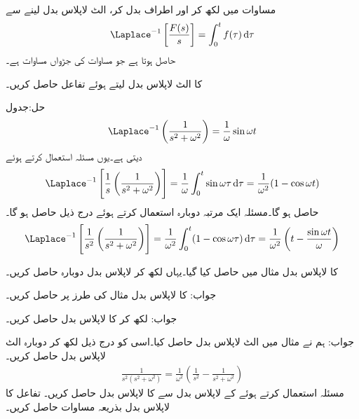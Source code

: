 مساوات  میں  لکھ کر اور اطراف بدل کر، الٹ لاپلاس بدل لینے سے
\begin{align}\label{مساوات_لاپلاس_تکمل_کا_بدل_جڑواں}
\Laplace^{-1}\left[\frac{F(s)}{s}\right]=\int_{0}^{t} f(\tau)\dif \tau
\end{align}
حاصل ہوتا ہے جو مساوات  کی جڑواں مساوات ہے۔

 کا الٹ لاپلاس بدل لیتے ہوئے تفاعل  حاصل کریں۔

حل:جدول  
\begin{align*}
\Laplace^{-1}\left(\frac{1}{s^2+\omega^2}\right)=\frac{1}{\omega}\sin \omega t
\end{align*}
دیتی ہے۔یوں مسئلہ  استعمال کرتے ہوئے
\begin{align*}
\Laplace^{-1}\left[\frac{1}{s}\left(\frac{1}{s^2+\omega^2}\right)\right]=\frac{1}{\omega} \int_{0}^{t}\sin \omega \tau \dif \tau=\frac{1}{\omega^2} (1-\cos \omega t)
\end{align*}
حاصل ہو گا۔مسئلہ  ایک مرتبہ دوبارہ استعمال کرتے ہوئے درج ذیل حاصل ہو گا۔
\begin{align*}
\Laplace^{-1}\left[\frac{1}{s^2} \left(\frac{1}{s^2+\omega^2}\right)\right]=\frac{1}{\omega^2} \int_{0}^{t}(1-\cos \omega \tau) \dif \tau=\frac{1}{\omega^2}\left(t-\frac{\sin \omega t}{\omega}\right)
\end{align*}


 کا لاپلاس بدل مثال  میں حاصل کیا گیا۔یہاں  لکھ کر لاپلاس بدل دوبارہ حاصل کریں۔

جواب:
 کا لاپلاس بدل مثال  کی طرز پر حاصل کریں۔

جواب:
 لکھ کر  کا لاپلاس بدل حاصل کریں۔

جواب:
ہم نے مثال  میں الٹ لاپلاس بدل حاصل کیا۔اسی کو درج ذیل لکھ کر دوبارہ الٹ لاپلاس بدل حاصل کریں۔
\begin{align*}
\frac{1}{s^2(s^2+\omega^2)}=\frac{1}{\omega^2}\left(\frac{1}{s^2}-\frac{1}{s^2+\omega^2}\right)
\end{align*}
مسئلہ  استعمال کرتے ہوئے  کے لاپلاس بدل سے  کا لاپلاس بدل حاصل کریں۔ 
تفاعل  کا لاپلاس بدل بذریعہ مساوات  حاصل کریں۔

